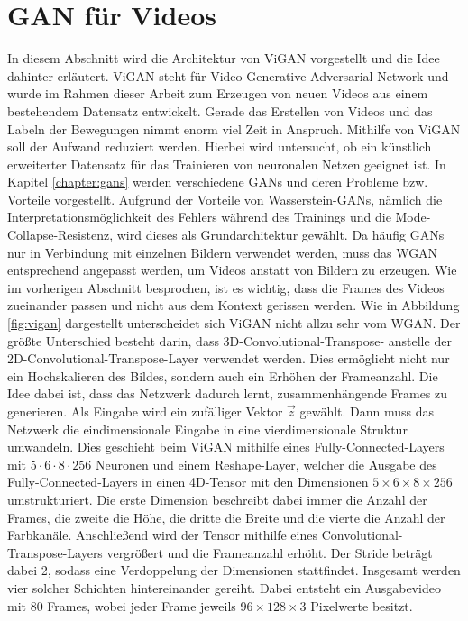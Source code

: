 \section{GAN für Videos}
In diesem Abschnitt wird die Architektur von ViGAN vorgestellt und die Idee
dahinter erläutert. ViGAN steht für Video-Generative-Adversarial-Network und
wurde im Rahmen dieser Arbeit zum Erzeugen von neuen Videos aus einem
bestehendem Datensatz entwickelt. Gerade das Erstellen von Videos und das Labeln
der Bewegungen nimmt enorm viel Zeit in Anspruch. Mithilfe von ViGAN soll der
Aufwand reduziert werden. Hierbei wird untersucht, ob ein künstlich erweiterter
Datensatz für das Trainieren von neuronalen Netzen geeignet ist. In Kapitel
\ref{chapter:gans} werden verschiedene GANs und deren Probleme bzw. Vorteile
vorgestellt. Aufgrund der Vorteile von Wasserstein-GANs, nämlich die
Interpretationsmöglichkeit des Fehlers während des Trainings und die
Mode-Collapse-Resistenz, wird dieses als Grundarchitektur gewählt. Da häufig
GANs nur in Verbindung mit einzelnen Bildern verwendet werden, muss das WGAN
entsprechend angepasst werden, um Videos anstatt von Bildern zu erzeugen. Wie im
vorherigen Abschnitt besprochen, ist es wichtig, dass die Frames des Videos
zueinander passen und nicht aus dem Kontext gerissen werden. Wie in Abbildung
\ref{fig:vigan} dargestellt unterscheidet sich ViGAN nicht allzu sehr vom WGAN.
Der größte Unterschied besteht darin, dass 3D-Convolutional-Transpose- anstelle
der 2D-Convolutional-Transpose-Layer verwendet werden. Dies ermöglicht nicht nur
ein Hochskalieren des Bildes, sondern auch ein Erhöhen der Frameanzahl. Die Idee
dabei ist, dass das Netzwerk dadurch lernt, zusammenhängende Frames zu
generieren. Als Eingabe wird ein zufälliger Vektor $\vec{z}$ gewählt. Dann muss
das Netzwerk die eindimensionale Eingabe in eine vierdimensionale Struktur
umwandeln. Dies geschieht beim ViGAN mithilfe eines Fully-Connected-Layers mit
$5 \cdot 6 \cdot 8 \cdot 256$ Neuronen und einem Reshape-Layer, welcher die
Ausgabe des Fully-Connected-Layers in einen 4D-Tensor mit den Dimensionen $5
\times 6 \times 8 \times 256$ umstrukturiert. Die erste Dimension beschreibt
dabei immer die Anzahl der Frames, die zweite die Höhe, die dritte die Breite
und die vierte die Anzahl der Farbkanäle. Anschließend wird der Tensor mithilfe
eines Convolutional-Transpose-Layers vergrößert und die Frameanzahl erhöht. Der
Stride beträgt dabei 2, sodass eine Verdoppelung der Dimensionen stattfindet.
Insgesamt werden vier solcher Schichten hintereinander gereiht. Dabei entsteht
ein Ausgabevideo mit 80 Frames, wobei jeder Frame jeweils $96 \times 128 \times
3$ Pixelwerte besitzt.

